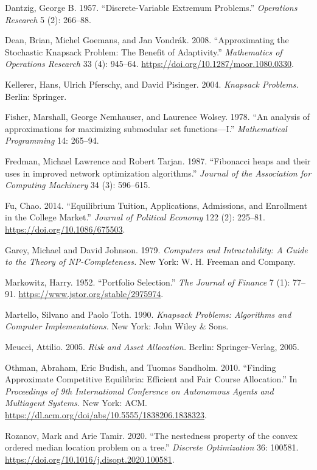 \documentclass[11pt]{article} %
\newif\ifen
\theoremstyle{definition}
\theoremstyle{definition}
\begin{document}
Dantzig, George B. 1957. ``Discrete-Variable Extremum Problems.'' \emph{Operations Research} 5 (2): 266--88.

Dean, Brian, Michel Goemans, and Jan Vondr\'ak. 2008. ``Approximating the Stochastic Knapsack Problem: The Benefit of Adaptivity.'' \emph{Mathematics of Operations Research} 33 (4): 945--64. \url{https://doi.org/10.1287/moor.1080.0330}.

Kellerer, Hans, Ulrich Pferschy, and David Pisinger. 2004. \emph{Knapsack Problems.} Berlin: Springer.

\ifen Kim, Minhee. 2015. ``[College application strategy] Six chances total\dots divide applications across reach, target, and safety schools'' (in Korean). Jungang Ilbo, Aug. 26. \url{https://doi.org/10.1086/664613}\fi

Fisher, Marshall, George Nemhauser, and Laurence Wolsey. 1978. ``An analysis of approximations for maximizing submodular set functions—I.'' \emph{Mathematical Programming} 14: 265--94. 

Fredman, Michael Lawrence and Robert Tarjan. 1987. ``Fibonacci heaps and their uses in improved network optimization algorithms.'' \emph{Journal of the Association for Computing Machinery} 34 (3): 596--615.

Fu, Chao. 2014. ``Equilibrium Tuition, Applications, Admissions, and Enrollment in the College Market.'' \emph{Journal of Political Economy} 122 (2): 225--81. \url{https://doi.org/10.1086/675503}. 

Garey, Michael and David Johnson. 1979. \emph{Computers and Intractability: A Guide to the Theory of NP-Completeness.} New York: W. H. Freeman and Company. 

Markowitz, Harry. 1952. ``Portfolio Selection.'' \emph{The Journal of Finance} 7 (1): 77--91. \url{https://www.jstor.org/stable/2975974}.

Martello, Silvano and Paolo Toth. 1990. \emph{Knapsack Problems: Algorithms and Computer Implementations.} New York: John Wiley \& Sons. 

Meucci, Attilio. 2005. \emph{Risk and Asset Allocation.} Berlin: Springer-Verlag, 2005. 

Othman, Abraham, Eric Budish, and Tuomas Sandholm. 2010. ``Finding Approximate Competitive Equilibria: Efficient and Fair
Course Allocation.'' In \emph{Proceedings of 9th International Conference on Autonomous Agents and Multiagent Systems.} New York: ACM. \url{https://dl.acm.org/doi/abs/10.5555/1838206.1838323}.

Rozanov, Mark and Arie Tamir. 2020. ``The nestedness property of the convex ordered median location problem on a tree.'' \emph{Discrete Optimization} 36: 100581. \url{https://doi.org/10.1016/j.disopt.2020.100581}.
\end{document}
